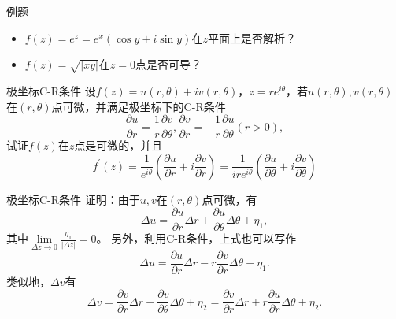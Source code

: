 \documentclass[11pt]{beamer}
\newcommand{\kong}[1][0.5]{\vspace{#1cm}}
\begin{document}
\begin{frame}{例题}
\begin{itemize}
	\item $f(z) = e^z = e^x(\cos y + i\sin y)$在$z$平面上是否解析？
	
	\kong[1]
	\item $f(z) = \sqrt{|xy|}$在$z=0$点是否可导？
\end{itemize}
\end{frame}

\begin{frame}{极坐标C-R条件}
设$f(z) = u(r,\theta) + iv(r,\theta)$，$z=re^{i\theta}$，若$u(r,\theta), v(r,\theta)$在$(r,\theta)$点可微，并满足极坐标下的C-R条件
\begin{equation}
\frac{\partial u}{\partial r} = \frac{1}{r}\frac{\partial v}{\partial \theta},
\frac{\partial v}{\partial r} = - \frac{1}{r}\frac{\partial u}{\partial \theta} (r>0),
\end{equation}
试证$f(z)$在$z$点是可微的，并且
\begin{equation}
f^\prime(z) = \frac{1}{e^{i\theta}}(\frac{\partial u}{\partial r} + i \frac{\partial v}{\partial r})
= \frac{1}{ire^{i\theta}}(\frac{\partial u}{\partial \theta} + i \frac{\partial v}{\partial \theta})
\end{equation}
\end{frame}

\begin{frame}{极坐标C-R条件}
证明：由于$u,v$在$(r,\theta)$点可微，有
\begin{equation}
\Delta u = \frac{\partial u}{\partial r}\Delta r + \frac{ \partial u}{ \partial \theta}\Delta \theta + \eta_1,
\end{equation}
其中$\lim\limits_{\Delta z \rightarrow 0} \frac{\eta_1}{|\Delta z|} = 0$。
另外，利用C-R条件，上式也可以写作
\begin{equation}
\Delta u = \frac{\partial u}{\partial r}\Delta r - r \frac{ \partial v}{ \partial r}\Delta \theta + \eta_1.
\end{equation}
类似地，$\Delta v$有
\begin{equation}
\Delta v = \frac{\partial v}{\partial r}\Delta r + \frac{ \partial v}{ \partial \theta}\Delta \theta + \eta_2
= \frac{\partial v}{\partial r}\Delta r + r \frac{ \partial u}{ \partial r}\Delta \theta + \eta_2.
\end{equation}
\end{frame}
\end{document}
